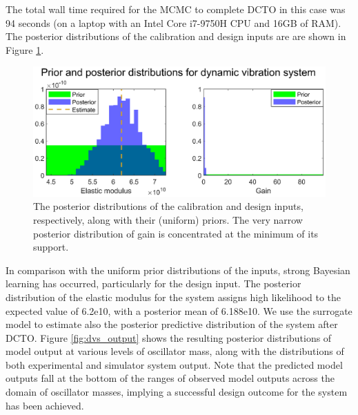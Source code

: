 \documentclass[12pt]{article}
\begin{document}
%
The total wall time required for the MCMC to complete DCTO in this case was 94 seconds (on a laptop with an Intel Core i7-9750H CPU and 16GB of RAM).
%
The posterior distributions of the calibration and design inputs are are shown in Figure \ref{fig:dvs_calib_and_design}.
%
\begin{figure}
	\centering
	\includegraphics[scale=0.85]{FIG_DVS_DCTO_input_posteriors}
	\captionsetup{width=.85\linewidth}
	\caption{The posterior distributions of the calibration and design inputs, respectively, along with their (uniform) priors. The very narrow posterior distribution of gain is concentrated at the minimum of its support.}
	\label{fig:dvs_calib_and_design}
\end{figure}
%
In comparison with the uniform prior distributions of the inputs, strong Bayesian learning has occurred, particularly for the design input.
%
The posterior distribution of the elastic modulus for the system assigns high likelihood to the expected value of 6.2e10, with a posterior mean of 6.188e10.
%
We use the surrogate model to estimate also the posterior predictive distribution of the system after DCTO.
%
Figure \ref{fig:dvs_output} shows the resulting posterior distributions of model output at various levels of oscillator mass, along with the distributions of both experimental and simulator system output.
%
Note that the predicted model outputs fall at the bottom of the ranges of observed model outputs across the domain of oscillator masses, implying a successful design outcome for the system has been achieved.
%

%
\end{document}
